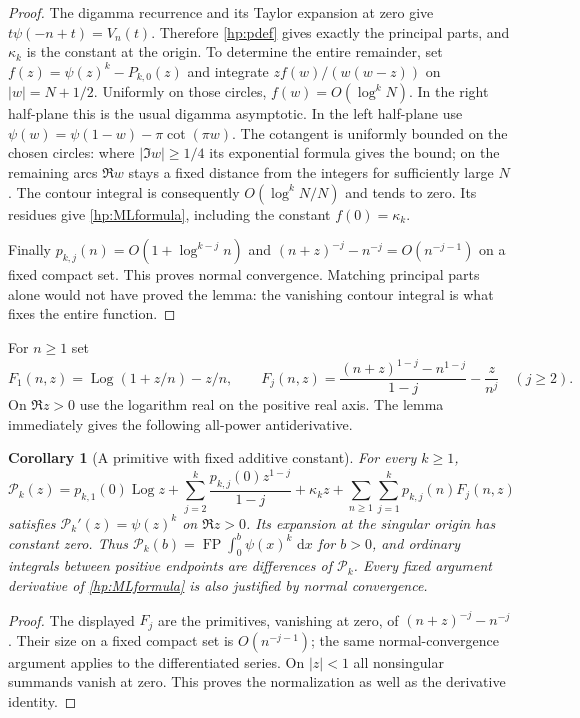 \documentclass[11pt]{article}
\numberwithin{equation}{section}
\theoremstyle{plain}
\newtheorem{corollary}[theorem]{Corollary}
\theoremstyle{definition}
\theoremstyle{remark}
\DeclareMathOperator{\Log}{Log}
\DeclareMathOperator{\FP}{FP}
\newcommand{\dd}{\,\mathrm d}
\begin{document}
\begin{proof}
The digamma recurrence and its Taylor expansion at zero give
$t\psi(-n+t)=V_n(t)$. Therefore \eqref{hp:pdef} gives exactly the
principal parts, and $\kappa_k$ is the constant at the origin.
To determine the entire remainder, set $f(z)=\psi(z)^k-P_{k,0}(z)$
and integrate $zf(w)/(w(w-z))$ on $|w|=N+1/2$.
Uniformly on those circles, $f(w)=O(\log^kN)$.
In the right half-plane this is the usual digamma asymptotic.
In the left half-plane use
$\psi(w)=\psi(1-w)-\pi\cot(\pi w)$. The cotangent is uniformly
bounded on the chosen circles: where $|\Im w|\ge1/4$ its exponential
formula gives the bound; on the remaining arcs $\Re w$ stays a fixed
distance from the integers for sufficiently large $N$.
The contour integral is consequently $O(\log^kN/N)$ and tends to zero.
Its residues give \eqref{hp:MLformula}, including the constant
$f(0)=\kappa_k$.

Finally $p_{k,j}(n)=O(1+\log^{k-j}n)$ and
$(n+z)^{-j}-n^{-j}=O(n^{-j-1})$ on a fixed compact set.
This proves normal convergence. Matching principal parts alone
would not have proved the lemma: the vanishing contour integral
is what fixes the entire function.
\end{proof}

For $n\ge1$ set
\[
 F_1(n,z)=\Log(1+z/n)-z/n,\qquad
 F_j(n,z)=\frac{(n+z)^{1-j}-n^{1-j}}{1-j}-\frac{z}{n^j}
 \quad(j\ge2).
\]
On $\Re z>0$ use the logarithm real on the positive real axis.
The lemma immediately gives the following all-power antiderivative.

\begin{corollary}[A primitive with fixed additive constant]\label{hp:primitive}
For every $k\ge1$,
\begin{equation}\label{hp:primitiveformula}
 \mathcal P_k(z)=p_{k,1}(0)\Log z+
      \sum_{j=2}^k\frac{p_{k,j}(0)z^{1-j}}{1-j}
      +\kappa_kz+
      \sum_{n\ge1}\sum_{j=1}^kp_{k,j}(n)F_j(n,z)
\end{equation}
satisfies $\mathcal P_k'(z)=\psi(z)^k$ on $\Re z>0$.
Its expansion at the singular origin has constant zero. Thus
$\mathcal P_k(b)=\FP\int_0^b\psi(x)^k\,\dd x$ for $b>0$, and
ordinary integrals between positive endpoints are differences of
$\mathcal P_k$. Every fixed argument derivative of
\eqref{hp:MLformula} is also justified by normal convergence.
\end{corollary}

\begin{proof}
The displayed $F_j$ are the primitives, vanishing at zero, of
$(n+z)^{-j}-n^{-j}$. Their size on a fixed compact set is
$O(n^{-j-1})$; the same normal-convergence argument applies to
the differentiated series. On $|z|<1$ all nonsingular summands
vanish at zero. This proves the normalization as well as the
derivative identity.
\end{proof}
\end{document}

